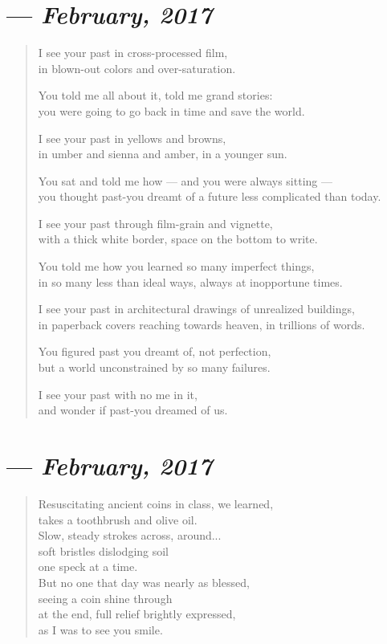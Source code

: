 \section{--- \textit{February, 2017}}

\begin{verse}
I see your past in cross-processed film,\\
in blown-out colors and over-saturation.

\vin You told me all about it, told me grand stories:\\
\vin you were going to go back in time and save the world.

I see your past in yellows and browns,\\
in umber and sienna and amber, in a younger sun.

\vin You sat and told me how --- and you were always sitting ---\\
\vin you thought past-you dreamt of a future less complicated than today.

I see your past through film-grain and vignette,\\
with a thick white border, space on the bottom to write.

\vin You told me how you learned so many imperfect things,\\
\vin in so many less than ideal ways, always at inopportune times.

I see your past in architectural drawings of unrealized buildings,\\
in paperback covers reaching towards heaven, in trillions of words.

\vin You figured past you dreamt of, not perfection,\\
\vin but a world unconstrained by so many failures.

I see your past with no me in it,\\
and wonder if past-you dreamed of us.
\end{verse}
\newpage

\section{--- \textit{February, 2017}}

\begin{verse}
Resuscitating ancient coins in class, we learned,\\
takes a toothbrush and olive oil.\\
Slow, steady strokes across, around...\\
soft bristles dislodging soil\\
one speck at a time.\\
But no one that day was nearly as blessed,\\
seeing a coin shine through\\
at the end, full relief brightly expressed,\\
as I was to see you smile.
\end{verse}
\newpage


